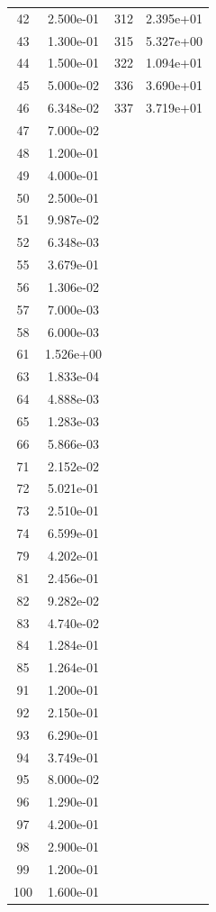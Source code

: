\documentclass[12pt]{article}
\begin{document}
\begin{longtable}{@{}cccc@{}}
42 & 2.500e-01 & 312 & 2.395e+01 \\
43 & 1.300e-01 & 315 & 5.327e+00 \\
44 & 1.500e-01 & 322 & 1.094e+01 \\
45 & 5.000e-02 & 336 & 3.690e+01 \\
46 & 6.348e-02 & 337 & 3.719e+01 \\
47 & 7.000e-02 &  &  \\
48 & 1.200e-01 &  &  \\
49 & 4.000e-01 &  &  \\
50 & 2.500e-01 &  &  \\
51 & 9.987e-02 &  &  \\
52 & 6.348e-03 &  &  \\
55 & 3.679e-01 &  &  \\
56 & 1.306e-02 &  &  \\
57 & 7.000e-03 &  &  \\
58 & 6.000e-03 &  &  \\
61 & 1.526e+00 &  &  \\
63 & 1.833e-04 &  &  \\
64 & 4.888e-03 &  &  \\
65 & 1.283e-03 &  &  \\
66 & 5.866e-03 &  &  \\
71 & 2.152e-02 &  &  \\
72 & 5.021e-01 &  &  \\
73 & 2.510e-01 &  &  \\
74 & 6.599e-01 &  &  \\
79 & 4.202e-01 &  &  \\
81 & 2.456e-01 &  &  \\
82 & 9.282e-02 &  &  \\
83 & 4.740e-02 &  &  \\
84 & 1.284e-01 &  &  \\
85 & 1.264e-01 &  &  \\
91 & 1.200e-01 &  &  \\
92 & 2.150e-01 &  &  \\
93 & 6.290e-01 &  &  \\
94 & 3.749e-01 &  &  \\
95 & 8.000e-02 &  &  \\
96 & 1.290e-01 &  &  \\
97 & 4.200e-01 &  &  \\
98 & 2.900e-01 &  &  \\
99 & 1.200e-01 &  &  \\
100 & 1.600e-01 &  &  \\

\end{longtable}
\end{document}
